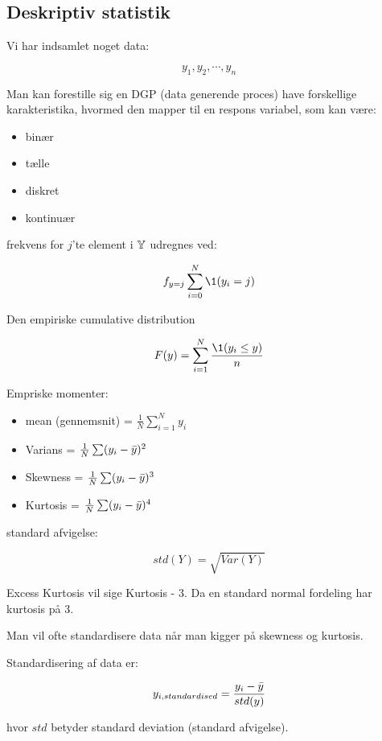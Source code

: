 \subsection{Deskriptiv statistik}

Vi har indsamlet noget data:

\begin{equation}
    y_1, y_2, \cdots ,y_n
\end{equation}

Man kan forestille sig en DGP (data generende proces) have forskellige karakteristika, hvormed den mapper til en respons variabel, som kan være:

\begin{itemize}
    \item binær
    \item tælle
    \item diskret
    \item kontinuær
\end{itemize}

frekvens for $j$'te element i $\mathbb{Y}$ udregnes ved:

\begin{equation}
    f_{y = j} \sum_{i=0}^N \1(y_i = j)
\end{equation}

Den empiriske cumulative distribution

\begin{equation}
    F(y) = \sum_{i=1}^N \frac{\1(y_i \leq y)}{n}
\end{equation}

Empriske momenter:

\begin{itemize}
    \item mean (gennemsnit) = $\frac{1}{N}\sum_{i=1}^N y_ i$
    \item Varians = $\frac{1}{N}\sum (y_i - \Bar{y})^2$
    \item Skewness = $\frac{1}{N}\sum (y_i - \Bar{y})^3$
    \item Kurtosis = $\frac{1}{N}\sum (y_i - \Bar{y})^4$
\end{itemize}

standard afvigelse:

\begin{equation}
    std(Y) = \sqrt{Var(Y)}
\end{equation}

Excess Kurtosis vil sige Kurtosis - 3. Da en standard normal fordeling har kurtosis  på  3.

Man vil ofte standardisere data når man kigger på skewness og kurtosis.

Standardisering af data er:

\begin{equation}
    y_{i, standardised} = \frac{y_i - \Bar{y}}{std(y)}
\end{equation}

hvor $std$ betyder standard deviation (standard afvigelse).

